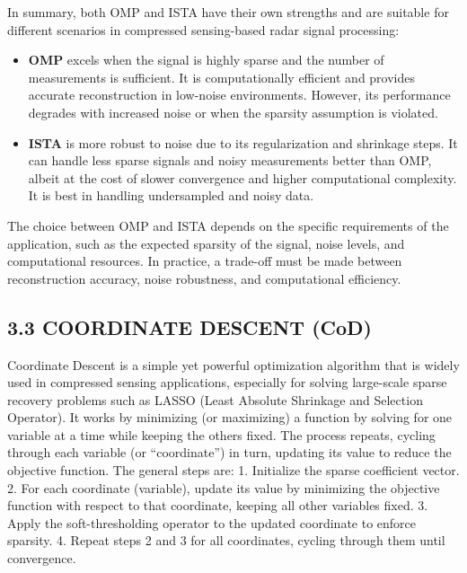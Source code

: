 \documentclass[
  letterpaper,
  DIV=11,
  numbers=noendperiod]{scrartcl}
\begin{document}
In summary, both OMP and ISTA have their own strengths and are suitable
for different scenarios in compressed sensing-based radar signal
processing:

\begin{itemize}
\item
  \textbf{OMP} excels when the signal is highly sparse and the number of
  measurements is sufficient. It is computationally efficient and
  provides accurate reconstruction in low-noise environments. However,
  its performance degrades with increased noise or when the sparsity
  assumption is violated.
\item
  \textbf{ISTA} is more robust to noise due to its regularization and
  shrinkage steps. It can handle less sparse signals and noisy
  measurements better than OMP, albeit at the cost of slower convergence
  and higher computational complexity. It is best in handling
  undersampled and noisy data.
\end{itemize}

The choice between OMP and ISTA depends on the specific requirements of
the application, such as the expected sparsity of the signal, noise
levels, and computational resources. In practice, a trade-off must be
made between reconstruction accuracy, noise robustness, and
computational efficiency.

\subsection{3.3 COORDINATE DESCENT (CoD)}\label{coordinate-descent-cod}

Coordinate Descent is a simple yet powerful optimization algorithm that
is widely used in compressed sensing applications, especially for
solving large-scale sparse recovery problems such as LASSO (Least
Absolute Shrinkage and Selection Operator). It works by minimizing (or
maximizing) a function by solving for one variable at a time while
keeping the others fixed. The process repeats, cycling through each
variable (or ``coordinate'') in turn, updating its value to reduce the
objective function. The general steps are: 1. Initialize the sparse
coefficient vector. 2. For each coordinate (variable), update its value
by minimizing the objective function with respect to that coordinate,
keeping all other variables fixed. 3. Apply the soft-thresholding
operator to the updated coordinate to enforce sparsity. 4. Repeat steps
2 and 3 for all coordinates, cycling through them until convergence.
\end{document}
